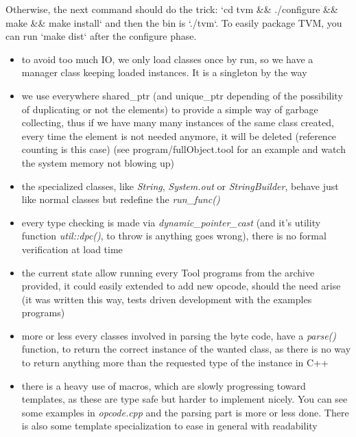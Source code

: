 Otherwise, the next command should do the trick:
`cd tvm \&\& ./configure \&\& make \&\& make install` and then the bin is
`./tvm`. To easily package TVM, you can run `make dist` after the configure
phase.

\begin{itemize}
	\item to avoid too much IO, we only load classes once by run, so we have
		a manager class keeping loaded instances. It is a singleton by
		the way

	\item we use everywhere shared\_ptr (and unique\_ptr depending of the
		possibility of duplicating or not the elements) to provide a
		simple way of garbage collecting, thus if we have many many
		instances of the same class created, every time the element is
		not needed anymore, it will be deleted (reference counting is
		this case) (see program/fullObject.tool for an example and watch
		the system memory not blowing up)

	\item the specialized classes, like \emph{String}, \emph{System.out} or
		\emph{StringBuilder}, behave just like normal classes but
		redefine the \emph{run\_func()}

	\item every type checking is made via \emph{dynamic\_pointer\_cast}
		(and it's utility function \emph{util::dpc()}, to throw is
		anything goes wrong), there is no formal verification at load
		time

	\item the current state allow running every Tool programs from the
		archive provided, it could easily extended to add new opcode,
		should the need arise (it was written this way, tests driven
		development with the examples programs)

	\item more or less every classes involved in parsing the byte code, have
		a \emph{parse()} function, to return the correct instance of the
		wanted class, as there is no way to return anything more than
		the requested type of the instance in C++

	\item there is a heavy use of macros, which are slowly progressing
		toward templates, as these are type safe but harder to implement
		nicely. You can see some examples in \emph{opcode.cpp} and the
		parsing part is more or less done. There is also some template
		specialization to ease in general with readability


\end{itemize}
